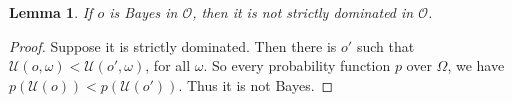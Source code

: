 \documentclass[a4paper,final]{article}
\newtheorem{theorem}{Theorem}[section]
\newtheorem{lemma}[theorem]{Lemma}
\renewcommand\O{\mathcal{O}}
\newcommand\Uwald{\mathcal{U}} %
\newcommand{\todoold}[2][]{\todo[backgroundcolor=white,bordercolor=orange!10,linecolor=gray!10, #1,caption={},textcolor=gray]{Pre-rev: #2}}
\newenvironment{CCM rewritten}
{\begingroup\color{blue}} %
{\endgroup}              %
\begin{document}
	
	
	
	
	
	\begin{lemma}\label{thm:cct:Bayes implies admiss}
		If $o$ is Bayes in $\O$, then it is not strictly dominated in $\O$.
	\end{lemma}
	\begin{proof}
		Suppose it is strictly dominated. Then there is $o'$ such that $\Uwald(o,\omega)<\Uwald(o',\omega)$, for all $\omega$. So every probability function $p$ over $\Omega$, we have $p( \Uwald(o))<p(\Uwald(o'))$. %
		Thus it is not Bayes.
	\end{proof}
	
\end{document}
